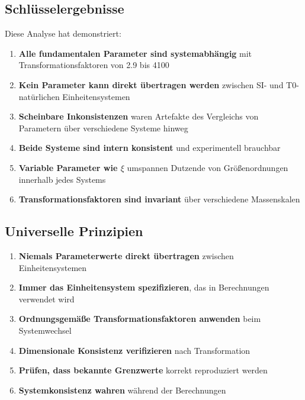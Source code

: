 \documentclass[12pt,a4paper]{article}
\newcommand{\xipar}{\xi}
\begin{document}
	\subsection{Schlüsselergebnisse}
	\label{subsec:schluesselergebnisse}
	
	Diese Analyse hat demonstriert:
	
	\begin{enumerate}
		\item \textbf{Alle fundamentalen Parameter sind systemabhängig} mit Transformationsfaktoren von 2.9 bis 4100
		\item \textbf{Kein Parameter kann direkt übertragen werden} zwischen SI- und T0-natürlichen Einheitensystemen
		\item \textbf{Scheinbare Inkonsistenzen} waren Artefakte des Vergleichs von Parametern über verschiedene Systeme hinweg
		\item \textbf{Beide Systeme sind intern konsistent} und experimentell brauchbar
		\item \textbf{Variable Parameter wie $\xipar$} umspannen Dutzende von Größenordnungen innerhalb jedes Systems
		\item \textbf{Transformationsfaktoren sind invariant} über verschiedene Massenskalen
	\end{enumerate}
	
	\subsection{Universelle Prinzipien}
	\label{subsec:universelle_prinzipien}
	
	\begin{tcolorbox}[colback=green!5!white,colframe=green!75!black,title=Universelle Parameter-Übertragungsregeln]
		\begin{enumerate}
			\item \textbf{Niemals Parameterwerte direkt übertragen} zwischen Einheitensystemen
			\item \textbf{Immer das Einheitensystem spezifizieren}, das in Berechnungen verwendet wird
			\item \textbf{Ordnungsgemäße Transformationsfaktoren anwenden} beim Systemwechsel
			\item \textbf{Dimensionale Konsistenz verifizieren} nach Transformation
			\item \textbf{Prüfen, dass bekannte Grenzwerte} korrekt reproduziert werden
			\item \textbf{Systemkonsistenz wahren} während der Berechnungen
		\end{enumerate}
	\end{tcolorbox}
	
\end{document}
